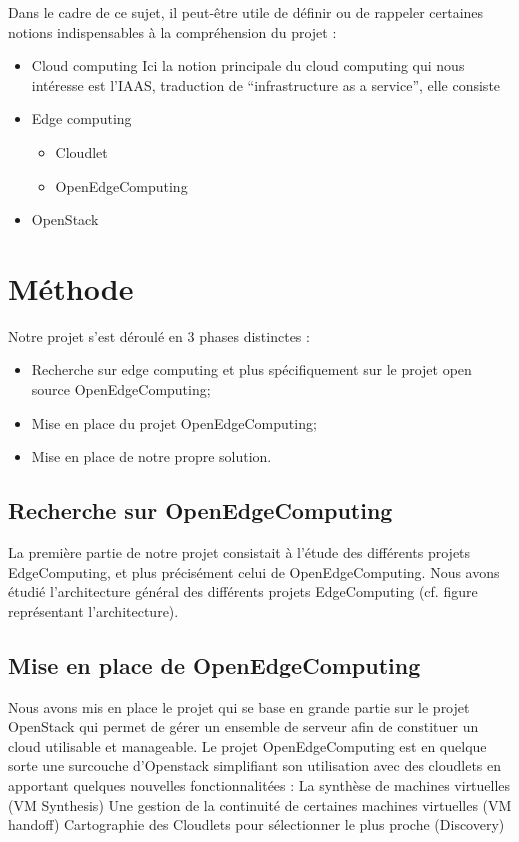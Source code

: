 \documentclass[twocolumn,a4paper]{IEEEtranfr}
\begin{document}
Dans le cadre de ce sujet, il peut-être utile de définir ou de rappeler certaines notions indispensables à la compréhension du projet : 
\begin{itemize}
\item Cloud computing
Ici la notion principale du cloud computing qui nous intéresse est l’IAAS, traduction de “infrastructure as a service”, elle consiste 
\item Edge computing
\begin{itemize}
\item Cloudlet
\item OpenEdgeComputing
\end{itemize}
\item OpenStack
\end{itemize}

\section{Méthode} 

Notre projet s’est déroulé en 3 phases distinctes : 

\begin{itemize}
\item Recherche sur edge computing et plus spécifiquement sur le projet open source OpenEdgeComputing;
\item Mise en place du projet OpenEdgeComputing;
\item Mise en place de notre propre solution.
\end{itemize}

\subsection{Recherche sur OpenEdgeComputing}

La première partie de notre projet consistait à l’étude des différents projets EdgeComputing, et plus précisément celui de OpenEdgeComputing. Nous avons étudié l’architecture général des différents projets EdgeComputing (cf. figure représentant l’architecture).

\subsection{Mise en place de OpenEdgeComputing}

Nous avons mis en place le projet qui se base en grande partie sur le projet OpenStack qui permet de gérer un ensemble de serveur afin de constituer un cloud utilisable et manageable.
Le projet OpenEdgeComputing est en quelque sorte une surcouche d’Openstack simplifiant son utilisation avec des cloudlets en apportant quelques nouvelles fonctionnalitées : 
La synthèse de machines virtuelles (VM Synthesis)
Une gestion de la continuité de certaines machines virtuelles (VM handoff)
Cartographie des Cloudlets pour sélectionner le plus proche (Discovery)
\end{document}

